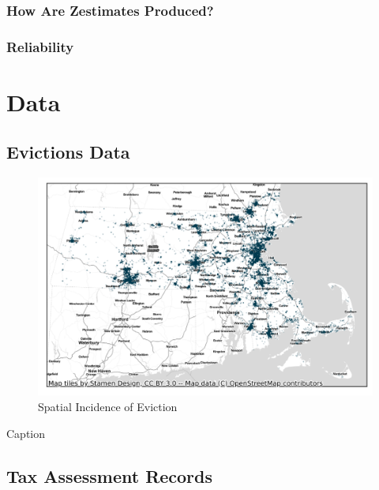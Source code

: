 \documentclass[12pt]{article}
\begin{document}
        \subsubsection{How Are Zestimates Produced?}
        \subsubsection{Reliability}
\section{Data} \label{sec:data}
    \begin{landscape}
    \subsection{Evictions Data}
        \begin{figure}[H]
            \centering
            \includegraphics{output/summary_statistics/figures/evictions_map.png}
            \caption{Spatial Incidence of Eviction}
            \label{fig:my_label}
        \end{figure}
    \end{landscape}
        \begin{table}[]
            \centering
            
            \caption{Caption}
            \label{tab:my_label}
        \end{table}
    
    \subsection{Tax Assessment Records}
\end{document}
